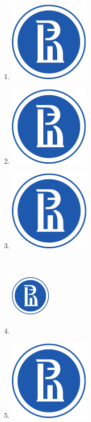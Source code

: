 \documentclass[a4paper]{article}
\begin{document}
\begin{enumerate}
\item \includegraphics{filename}
\item \includegraphics[scale=0.5]{filename}
\item \includegraphics[height=4cm,keepaspectratio]{filename}
\item \includegraphics[height=4cm,width=2cm]{filename}
\item \includegraphics[width=.1\textwidth]{filename}
\end{enumerate}
\end{document}
